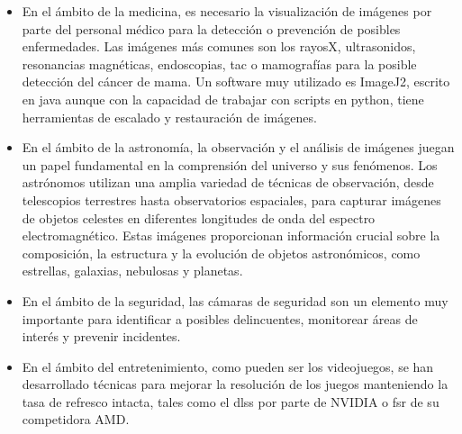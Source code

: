 \begin{itemize}
	\item En el ámbito de la medicina, es necesario la visualización de imágenes por parte del personal médico para la detección o prevención de posibles enfermedades. Las imágenes más comunes son los rayosX, ultrasonidos, resonancias magnéticas, endoscopias, \gls{tac} o mamografías para la posible detección del cáncer de mama\cite{VisibleBodyBlog,medicalrestore1,ganinmedicine,sonysurgicalimaging}. Un software muy utilizado es ImageJ2, escrito en java aunque con la capacidad de trabajar con scripts en python, tiene herramientas de escalado y restauración de imágenes\cite{imagej2}.
	
	\item En el ámbito de la astronomía, la observación y el análisis de imágenes juegan un papel fundamental en la comprensión del universo y sus fenómenos. Los astrónomos utilizan una amplia variedad de técnicas de observación, desde telescopios terrestres hasta observatorios espaciales, para capturar imágenes de objetos celestes en diferentes longitudes de onda del espectro electromagnético. Estas imágenes proporcionan información crucial sobre la composición, la estructura y la evolución de objetos astronómicos, como estrellas, galaxias, nebulosas y planetas\cite{astronomyrestore1,srastology}.
	
	\item En el ámbito de la seguridad, las cámaras de seguridad son un elemento muy importante para identificar a posibles delincuentes, monitorear áreas de interés y prevenir incidentes\cite{securityrestore1}.
	
	\item En el ámbito del entretenimiento, como pueden ser los videojuegos, se han desarrollado técnicas para mejorar la resolución de los juegos manteniendo la tasa de refresco intacta, tales como el \gls{dlss} por parte de NVIDIA o \gls{fsr} de su competidora AMD\cite{nvidia_dlss,amd_fsr}.
\end{itemize}



